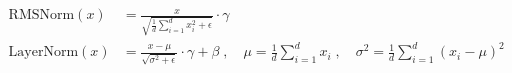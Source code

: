 \begin{align*}
    \text{RMSNorm}(x) &= \frac{x}{\sqrt{\frac{1}{d}\sum_{i=1}^d x_i^2 + \epsilon}} \cdot \gamma \\
    \text{LayerNorm}(x) &= \frac{x - \mu}{\sqrt{\sigma^2 + \epsilon}} \cdot \gamma + \beta \;,\quad \mu = \frac{1}{d}\sum_{i=1}^d x_i \;,\quad \sigma^2 = \frac{1}{d}\sum_{i=1}^d (x_i - \mu)^2
\end{align*}